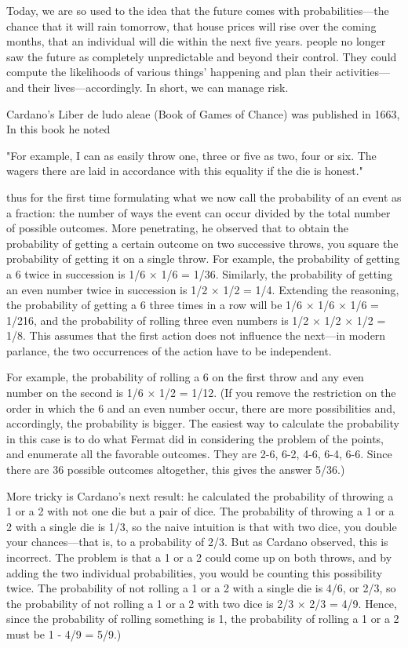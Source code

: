 Today, we are so used to the idea that the future comes with probabilities—the chance that it will rain tomorrow, that house prices will rise over the coming months, that an individual will die within the next five years. people no longer saw the future as completely unpredictable and beyond their control. They could compute the likelihoods of various things’ happening and plan their activities—and their lives—accordingly. In short, we can manage risk.

Cardano’s Liber de ludo aleae (Book of Games of Chance) was published in 1663, In this book he noted

"For example, I can as easily throw one, three or five as two, four or six. The wagers there are laid in accordance with this equality if the die is honest."

thus for the first time formulating what we now call the probability of an event as a fraction: the number of ways the event can occur divided by the total number of possible outcomes. More penetrating, he observed that to obtain the probability of getting a certain outcome on two successive throws, you square the probability of getting it on a single throw. For example, the probability of getting a 6 twice in succession is 1/6 × 1/6 = 1/36. Similarly, the probability of getting an even number twice in succession is 1/2 × 1/2 = 1/4. Extending the reasoning, the probability of getting a 6 three times in a row will be 1/6 × 1/6 × 1/6 = 1/216, and the probability of rolling three even numbers is 1/2 × 1/2 × 1/2 = 1/8. This assumes that the first action does not influence the next—in modern parlance, the two occurrences of the action have to be independent.

For example, the probability of rolling a 6 on the first throw and any even number on the second is 1/6 × 1/2 = 1/12. (If you remove the restriction on the order in which the 6 and an even number occur, there are more possibilities and, accordingly, the probability is bigger. The easiest way to calculate the probability in this case is to do what Fermat did in considering the problem of the points, and enumerate all the favorable outcomes. They are 2-6, 6-2, 4-6, 6-4, 6-6. Since there are 36 possible outcomes altogether, this gives the answer 5/36.)

More tricky is Cardano’s next result: he calculated the probability of throwing a 1 or a 2 with not one die but a pair of dice. The probability of throwing a 1 or a 2 with a single die is 1/3, so the naive intuition is that with two dice, you double your chances—that is, to a probability of 2/3. But as Cardano observed, this is incorrect. The problem is that a 1 or a 2 could come up on both throws, and by adding the two individual probabilities, you would be counting this possibility twice. The probability of not rolling a 1 or a 2 with a single die is 4/6, or 2/3, so the probability of not rolling a 1 or a 2 with two dice is 2/3 × 2/3 = 4/9. Hence, since the probability of rolling something is 1, the probability of rolling a 1 or a 2 must be 1 - 4/9 = 5/9.)


